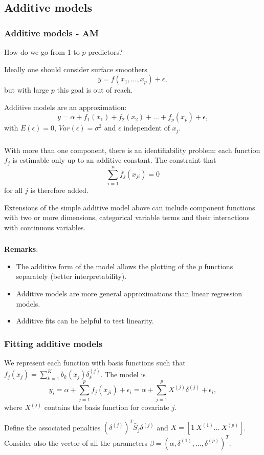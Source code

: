 \documentclass{beamer}
\newcommand{\bs}{\bigskip}
\begin{document}
\subsection{Additive models}
\begin{frame}
\frametitle{Additive models - AM}
How do we go from 1 to $p$ predictors?

\bs
Ideally one should consider surface smoothers
$$y = f(x_1, \ldots, x_p) + \epsilon,$$
but with large $p$ this goal is out of reach.

\bs 
{\color{blue}Additive models} are an approximation:
$$y=\alpha+f_1(x_1) + f_2(x_2)+\ldots+f_p(x_p)+\epsilon,$$
with $E(\epsilon)=0$, $Var(\epsilon)=\sigma^2$ and $\epsilon$ independent of $x_j$.

\end{frame}


\begin{frame}
\frametitle{}

\bs
With more than one component, there is an identifiability problem: each function
$f_j$ is estimable only up to an additive constant. The constraint that 
$$\sum_{i=1}^n f_j(x_{ji})=0$$
for all $j$ is therefore added. 

\bs
Extensions of the simple additive model above can include component functions
with two or more dimensions, categorical variable terms and their interactions
with continuous variables.
\end{frame}

\begin{frame}
\frametitle{}
\textbf{Remarks}:
\begin{itemize} 
\item The additive form of the model allows the plotting of the $p$ functions
separately (better interpretability).
\item Additive models are more general approximations than linear regression models.
\item Additive fits can be helpful to test linearity.
\end{itemize}

\end{frame}


\begin{frame}
\frametitle{Fitting additive models}

We represent each function with basis functions such that $f_j(x_j) =
\sum_{k=1}^K b_k(x_j) \delta_k^{(j)}$. The model is
$$y_i = \alpha+ \sum_{j=1}^p f_j(x_{ji}) +\epsilon_i = \alpha+ \sum_{j=1}^p X^{(j)} \delta^{(j)} +\epsilon_i,$$
where $X^{(j)}$ contains the basis function for covariate $j$. 

\bs 
Define the associated penalties $(\delta^{(j)})^T \bar{S}_j \delta^{(j)}$ and $X
= [1 \  X^{(1)}  \ldots  \ X^{(p)} ]$. Consider also the vector of all the
parameters $\beta = (\alpha, \delta^{(1)}, \ldots, \delta^{(p)})^T$.
\end{frame}
\end{document}
